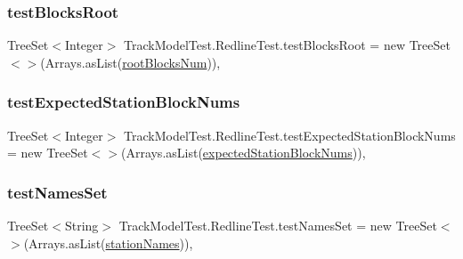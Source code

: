 \subsubsection{\texorpdfstring{test\+Blocks\+Root}{testBlocksRoot}}
{\footnotesize\ttfamily Tree\+Set$<$Integer$>$ Track\+Model\+Test.\+Redline\+Test.\+test\+Blocks\+Root = new Tree\+Set$<$$>$(Arrays.\+as\+List(\hyperlink{classTrackModelTest_1_1RedlineTest_af6c0d104a6e4c99a443aa92e20b1bc1c}{root\+Blocks\+Num}))\hspace{0.3cm}{\ttfamily [static]}, {\ttfamily [private]}}

\mbox{\label{classTrackModelTest_1_1RedlineTest_a8a94587a81798044a60016e29a09cd72}} 
\subsubsection{\texorpdfstring{test\+Expected\+Station\+Block\+Nums}{testExpectedStationBlockNums}}
{\footnotesize\ttfamily Tree\+Set$<$Integer$>$ Track\+Model\+Test.\+Redline\+Test.\+test\+Expected\+Station\+Block\+Nums = new Tree\+Set$<$$>$(Arrays.\+as\+List(\hyperlink{classTrackModelTest_1_1RedlineTest_a15b5dcba3d2f7800a07015dfa3a3c015}{expected\+Station\+Block\+Nums}))\hspace{0.3cm}{\ttfamily [static]}, {\ttfamily [private]}}

\mbox{\label{classTrackModelTest_1_1RedlineTest_a587f6d52dfee441de79812fededfa84b}} 
\subsubsection{\texorpdfstring{test\+Names\+Set}{testNamesSet}}
{\footnotesize\ttfamily Tree\+Set$<$String$>$ Track\+Model\+Test.\+Redline\+Test.\+test\+Names\+Set = new Tree\+Set$<$$>$(Arrays.\+as\+List(\hyperlink{classTrackModelTest_1_1RedlineTest_af522bafd02e8cc4d845420fd692d3d9b}{station\+Names}))\hspace{0.3cm}{\ttfamily [static]}, {\ttfamily [private]}}

